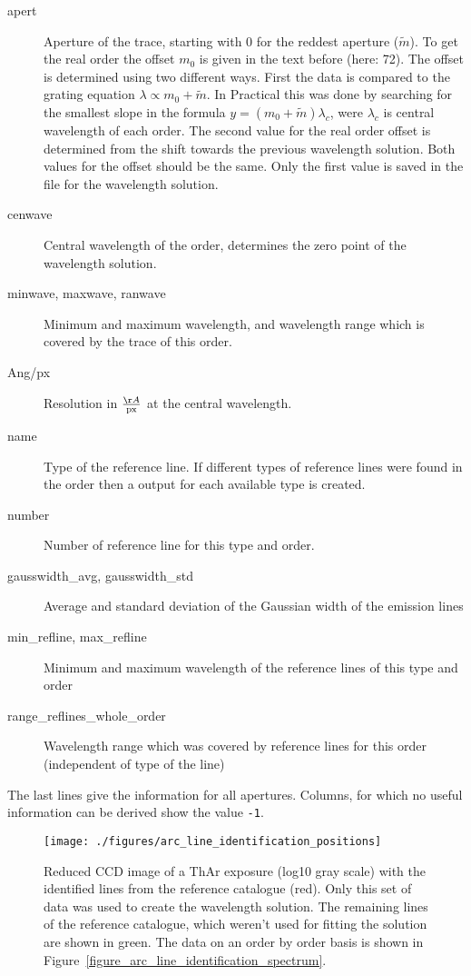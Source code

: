 \documentclass[10pt,a4paper]{article}
\begin{document}
\begin{description}
  \item[apert] Aperture of the trace, starting with 0 for the reddest aperture ($\tilde{m}$). To get the real order the offset $m_0$ is given in the text before (here: 72). The offset is determined using two different ways. First the data is compared to the grating equation $\lambda \propto m_0 + \tilde{m}$. In Practical this was done by searching for the smallest slope in the formula $y = (m_0 + \tilde{m})\lambda_c$, were $\lambda_c$ is central wavelength of each order. The second value for the real order offset is determined from the shift towards the previous wavelength solution. Both values for the offset should be the same. Only the first value is saved in the file for the wavelength solution.
  \item[cenwave] Central wavelength of the order, determines the zero point of the wavelength solution.
  \item[minwave, maxwave, ranwave] Minimum and maximum wavelength, and wavelength range which is covered by the trace of this order.
  \item[Ang/px] Resolution in $\frac{\AA}{\mathrm{px}}$ at the central wavelength.
  \item[name] Type of the reference line. If different types of reference lines were found in the order then a output for each available type is created.
  \item[number] Number of reference line for this type and order.
  \item[gausswidth\_avg, gausswidth\_std] Average and standard deviation of the Gaussian width of the emission lines
  \item[min\_refline, max\_refline] Minimum and maximum wavelength of the reference lines of this type and order
  \item[range\_reflines\_whole\_order] Wavelength range which was covered by reference lines for this order (independent of type of the line)
\end{description}
The last lines give the information for all apertures. Columns, for which no useful information can be derived show the value \verb|-1|.

\begin{figure} 
  \begin{center}
    \texttt{[image: ./figures/arc\_line\_identification\_positions]}
  \end{center} 
  \caption{Reduced CCD image of a ThAr exposure (log10 gray scale) with the identified lines from the reference catalogue (red). Only this set of data was used to create the wavelength solution. The remaining lines of the reference catalogue, which weren't used for fitting the solution are shown in green. The data on an order by order basis is shown in Figure~\ref{figure_arc_line_identification_spectrum}.
    \label{figure_arc_line_identification_positions}}
\end{figure}
\end{document}
